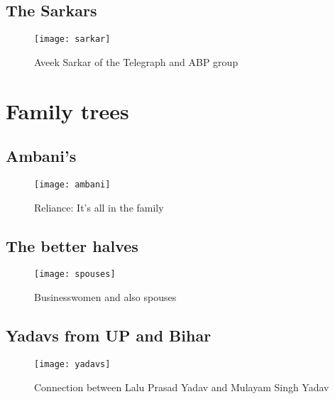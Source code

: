 \subsection{The Sarkars}

\begin{figure}[H]
\begin{center}  
\texttt{[image: sarkar]} 
\caption{Aveek Sarkar of the Telegraph and ABP group}
\label{fig:sarkar}
\end{center}
\end{figure}


\section{Family trees}

\subsection{Ambani's}

\begin{figure}[H]
\begin{center}  
\texttt{[image: ambani]} 
\caption{Reliance: It's all in the family}
\label{fig:ambani}
\end{center}
\end{figure}


\subsection{The better halves}

\begin{figure}[H]
\begin{center}  
\texttt{[image: spouses]} 
\caption{Businesswomen and also spouses}
\label{fig:spouses}
\end{center}
\end{figure}


\subsection{Yadavs from UP and Bihar}

\begin{figure}[H]
\begin{center}  
\texttt{[image: yadavs]} 
\caption{Connection between Lalu Prasad Yadav and Mulayam Singh Yadav}
\label{fig:yadavs}
\end{center}
\end{figure}


